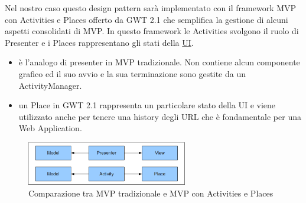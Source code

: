 Nel nostro caso questo design pattern sar\`a implementato con il framework MVP con
Activities e Places offerto da GWT 2.1 che semplifica la gestione di alcuni
aspetti consolidati di MVP. In questo framework le Activities svolgono il ruolo
di Presenter e i Places rappresentano gli stati della \underline{UI}.
\begin{itemize}
  \item{ }
  \`e l'analogo di presenter in MVP tradizionale. Non contiene alcun componente
  grafico ed il suo avvio e la sua terminazione sono gestite da un
  ActivityManager.
  \item{ }
  un Place in GWT 2.1 rappresenta un particolare stato della UI e viene
  utilizzato anche per tenere una history degli URL che \`e fondamentale per una
  Web Application.

\end{itemize} 
\begin{figure}[h]
\centering
\includegraphics[width=7cm]{img/ST/mvpap.png}
\caption{Comparazione tra MVP tradizionale e MVP con Activities e Places}
\end{figure}

\newpage

